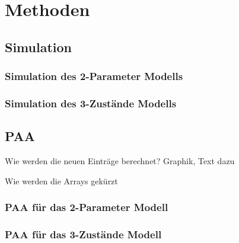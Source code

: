 \chapter{Methoden} 
\label{chapter:meth}

\section{Simulation}

\subsection{Simulation des 2-Parameter Modells}
\subsection{Simulation des 3-Zustände Modells}

\section{PAA}

Wie werden die neuen Einträge berechnet? Graphik, Text dazu

Wie werden die Arrays gekürzt

\subsection{PAA für das 2-Parameter Modell}

\subsection{PAA für das 3-Zustände Modell}